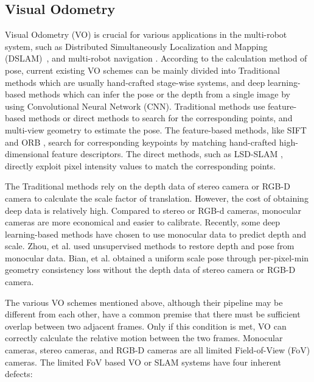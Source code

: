 \label{sec:related}

\subsection{Visual Odometry}

Visual Odometry (VO) is crucial for various applications in the multi-robot system, such as Distributed Simultaneously Localization and Mapping (DSLAM)~\cite{corah2019communication, cieslewski2018data}, and multi-robot navigation \cite{tanner2005towards}.
According to the calculation method of pose, current existing VO schemes can be mainly divided into Traditional methods which are usually hand-crafted stage-wise systems, and deep learning-based methods which can infer the pose or the depth from a single image by using Convolutional Neural Network (CNN).
Traditional methods use feature-based methods or direct methods to search for the corresponding points, and multi-view geometry to estimate the pose.
The feature-based methods, like SIFT \cite{Lowe-478} and ORB \cite{Rublee-orb}, search for corresponding keypoints by matching hand-crafted high-dimensional feature descriptors.
The direct methods, such as LSD-SLAM \cite{LSD-SLAM}, directly exploit pixel intensity values to match the corresponding points.

The Traditional methods rely on the depth data of stereo camera \cite{Howard-stereo} or RGB-D \cite{Huang-RGBD} camera to calculate the scale factor of translation.
However, the cost of obtaining deep data is relatively high. Compared to stereo or RGB-d cameras, monocular cameras are more economical and easier to calibrate. 
Recently, some deep learning-based methods have chosen to use monocular data to predict depth and scale. 
Zhou, et al. \cite{zhou2017unsupervised} used unsupervised methods to restore depth and pose from monocular data.
Bian, et al. \cite{bian2019unsupervised} obtained a uniform scale pose through per-pixel-min geometry consistency loss without the depth data of stereo camera or RGB-D camera.

The various VO schemes mentioned above, although their pipeline may be different from each other, have a common premise that there must be sufficient overlap between two adjacent frames.
Only if this condition is met, VO can correctly calculate the relative motion between the two frames.
Monocular cameras, stereo cameras, and RGB-D cameras are all limited Field-of-View (FoV) cameras.
The limited FoV based VO or SLAM systems have four inherent defects:

